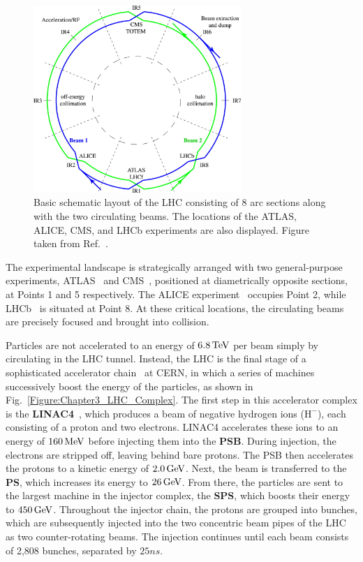 \begin{figure}[h]
\centering
\includegraphics[width= 0.7\textwidth]{Figures/Chapter3/LHC_BasicLayout.jpg}
\caption{Basic schematic layout of the LHC consisting of 8 arc sections along with the two circulating beams. The locations of the ATLAS, ALICE, CMS, and LHCb experiments are also displayed. Figure taken from Ref.~\cite{LHC_BasicLayout}.}
\label{Figure:Chapter3_LHC_BasicLayout}
\end{figure}

The experimental landscape is strategically arranged with two general-purpose experiments, ATLAS~\cite{LHC_ATLAS} and CMS~\cite{LHC_CMS}, positioned at diametrically opposite sections, at Points 1 and 5 respectively. The ALICE experiment~\cite{LHC_ALICE} occupies Point 2, while LHCb~\cite{LHC_LCHb} is situated at Point 8. At these critical locations, the circulating beams are precisely focused and brought into collision.

Particles are not accelerated to an energy of $6.8\,\text{Te\hspace{-.08em}V}$ per beam simply by circulating in the LHC tunnel. Instead, the LHC is the final stage of a sophisticated accelerator chain~\cite{LHC_InjectorComplex} at CERN, in which a series of machines successively boost the energy of the particles, as shown in Fig.~\ref{Figure:Chapter3_LHC_Complex}. The first step in this accelerator complex is the \textbf{\ac{LINAC4}}~\cite{LINAC4}, which produces a beam of negative hydrogen ions ($\text{H}^-$), each consisting of a proton and two electrons. LINAC4 accelerates these ions to an energy of $160\,\text{Me\hspace{-.08em}V}$ before injecting them into the \textbf{\ac{PSB}}. During injection, the electrons are stripped off, leaving behind bare protons. The PSB then accelerates the protons to a kinetic energy of $2.0\,\text{Ge\hspace{-.08em}V}$. Next, the beam is transferred to the \textbf{\ac{PS}}, which increases its energy to $26\,\text{Ge\hspace{-.08em}V}$. From there, the particles are sent to the largest machine in the injector complex, the \textbf{\ac{SPS}}, which boosts their energy to $450\,\text{Ge\hspace{-.08em}V}$. Throughout the injector chain, the protons are grouped into bunches, which are subsequently injected into the two concentric beam pipes of the LHC as two counter-rotating beams. The injection continues until each beam consists of 2,808 bunches, separated by $25\unit{ns}$.

